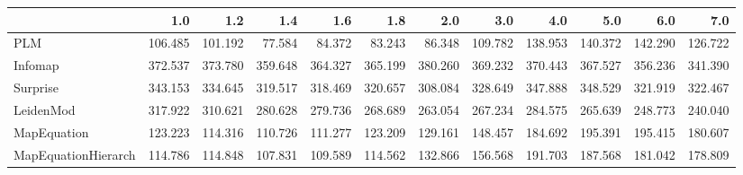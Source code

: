 \begin{tabular}{lrrrrrrrrrrr}
\toprule
{} &     1.0 &     1.2 &     1.4 &     1.6 &     1.8 &     2.0 &     3.0 &     4.0 &     5.0 &     6.0 &     7.0 \\
\midrule
PLM                 & 106.485 & 101.192 &  77.584 &  84.372 &  83.243 &  86.348 & 109.782 & 138.953 & 140.372 & 142.290 & 126.722 \\
Infomap             & 372.537 & 373.780 & 359.648 & 364.327 & 365.199 & 380.260 & 369.232 & 370.443 & 367.527 & 356.236 & 341.390 \\
Surprise            & 343.153 & 334.645 & 319.517 & 318.469 & 320.657 & 308.084 & 328.649 & 347.888 & 348.529 & 321.919 & 322.467 \\
LeidenMod           & 317.922 & 310.621 & 280.628 & 279.736 & 268.689 & 263.054 & 267.234 & 284.575 & 265.639 & 248.773 & 240.040 \\
MapEquation         & 123.223 & 114.316 & 110.726 & 111.277 & 123.209 & 129.161 & 148.457 & 184.692 & 195.391 & 195.415 & 180.607 \\
MapEquationHierarch & 114.786 & 114.848 & 107.831 & 109.589 & 114.562 & 132.866 & 156.568 & 191.703 & 187.568 & 181.042 & 178.809 \\
\bottomrule
\end{tabular}

